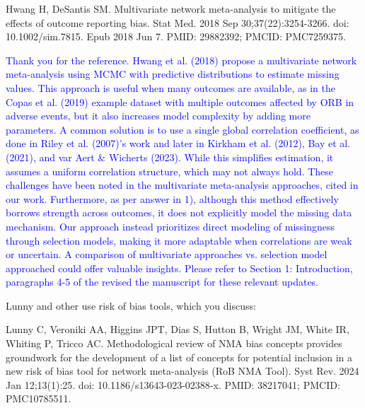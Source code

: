 \documentclass{article}
\begin{document}
\bigskip

Hwang H, DeSantis SM. Multivariate network meta-analysis to mitigate the effects of outcome reporting bias. Stat Med. 2018 Sep 30;37(22):3254-3266. doi: 10.1002/sim.7815. Epub 2018 Jun 7. PMID: 29882392; PMCID: PMC7259375. 

\bigskip

\textcolor{blue}{Thank you for the reference. Hwang et al. (2018) propose a multivariate network meta-analysis using MCMC with predictive distributions to estimate missing values. This approach is useful when many outcomes are available, as in the Copas et al. (2019) example dataset with multiple outcomes affected by ORB in adverse events, but it also increases model complexity by adding more parameters. A common solution is to use a single global correlation coefficient, as done in Riley et al. (2007)'s work and later in Kirkham et al. (2012), Bay et al. (2021), and var Aert \& Wicherts (2023). While this simplifies estimation, it assumes a uniform correlation structure, which may not always hold. These challenges have been noted in the multivariate meta-analysis approaches, cited in our work. Furthermore, as per answer in 1), although this method effectively borrows strength across outcomes, it does not explicitly model the missing data mechanism. Our approach instead prioritizes direct modeling of missingness through selection models, making it more adaptable when correlations are weak or uncertain. A comparison of multivariate approaches vs. selection model approached could offer valuable insights. Please refer to Section 1: Introduction, paragraphs 4-5 of the revised the manuscript for these relevant updates.}

\bigskip

Lunny and other use risk of bias tools, which you discuss:

\bigskip

Lunny C, Veroniki AA, Higgins JPT, Dias S, Hutton B, Wright JM, White IR, Whiting P, Tricco AC. Methodological review of NMA bias concepts provides groundwork for the development of a list of concepts for potential inclusion in a new risk of bias tool for network meta-analysis (RoB NMA Tool). Syst Rev. 2024 Jan 12;13(1):25. doi: 10.1186/s13643-023-02388-x. PMID: 38217041; PMCID: PMC10785511. 

\bigskip
\end{document}
